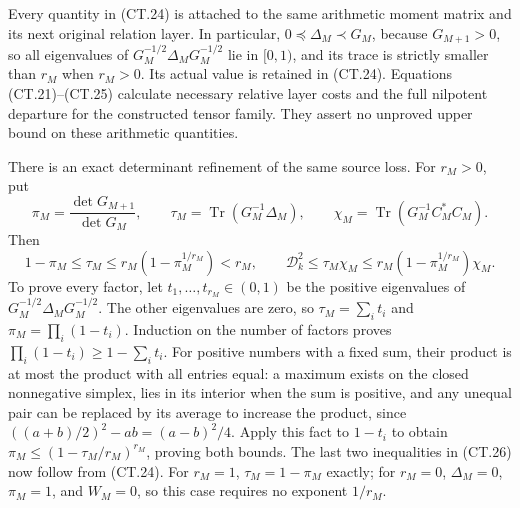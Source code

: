 Every quantity in (CT.24) is attached to the same arithmetic moment
matrix and its next original relation layer.  In particular,
\(0\preceq\Delta_M\prec G_M\), because \(G_{M+1}>0\),
so all eigenvalues of \(G_M^{-1/2}\Delta_MG_M^{-1/2}\) lie
in \([0,1)\), and its trace is strictly smaller than \(r_M\)
when \(r_M>0\).  Its actual value is retained in (CT.24).
Equations (CT.21)--(CT.25) calculate necessary relative layer costs
and the full nilpotent departure for the constructed tensor family.
They assert no unproved upper bound on these arithmetic quantities.

There is an exact determinant refinement of the same source loss.
For \(r_M>0\), put
\[
 \pi_M=\frac{\det G_{M+1}}{\det G_M},\qquad
 \tau_M=\operatorname{Tr}(G_M^{-1}\Delta_M),\qquad
 \chi_M=\operatorname{Tr}(G_M^{-1}C_M^*C_M).
\]
Then
\[
 1-\pi_M\le\tau_M\le r_M(1-\pi_M^{1/r_M})<r_M,
 \qquad
 \boxed{\mathcal D_k^2\le\tau_M\chi_M
                    \le r_M(1-\pi_M^{1/r_M})\chi_M.}      \tag{CT.26}
\]
To prove every factor, let \(t_1,\ldots,t_{r_M}\in(0,1)\)
be the positive eigenvalues of
\(G_M^{-1/2}\Delta_MG_M^{-1/2}\).  The other eigenvalues
are zero, so
\(\tau_M=\sum_i t_i\) and
\(\pi_M=\prod_i(1-t_i)\).  Induction on the number of
factors proves \(\prod_i(1-t_i)\ge1-\sum_i t_i\).
For positive numbers with a fixed sum, their product is at most the
product with all entries equal: a maximum exists on the closed
nonnegative simplex, lies in its interior when the sum is positive,
and any unequal pair can be replaced by its average to increase
the product, since
\(((a+b)/2)^2-ab=(a-b)^2/4\).  Apply this fact to
\(1-t_i\) to obtain
\(\pi_M\le(1-\tau_M/r_M)^{r_M}\), proving both bounds.
The last two inequalities in (CT.26) now follow from (CT.24).
For \(r_M=1\), \(\tau_M=1-\pi_M\) exactly; for
\(r_M=0\), \(\Delta_M=0\), \(\pi_M=1\), and
\(W_M=0\), so this case requires no exponent \(1/r_M\).
